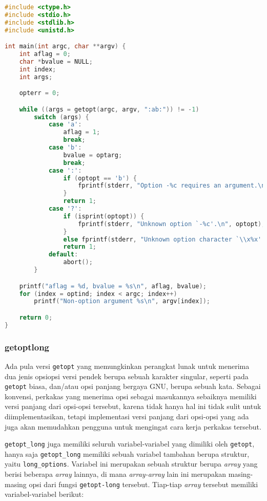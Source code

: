 \begin{lstlisting}[language=C, caption=Contoh sederhana penggunaan getopt, label=code:getopt-usage]
#include <ctype.h>
#include <stdio.h>
#include <stdlib.h>
#include <unistd.h>

int main(int argc, char **argv) {
    int aflag = 0;
    char *bvalue = NULL;
    int index;
    int args;

    opterr = 0;

    while ((args = getopt(argc, argv, ":ab:")) != -1)
        switch (args) {
	        case 'a':
	            aflag = 1;
	            break;
	        case 'b':
	            bvalue = optarg;
	            break;
	        case ':':
    	        if (optopt == 'b') {
	                fprintf(stderr, "Option -%c requires an argument.\n", optopt);
	            }
	            return 1;
	        case '?':
	            if (isprint(optopt)) {
	                fprintf(stderr, "Unknown option `-%c'.\n", optopt);
	            }
	            else fprintf(stderr, "Unknown option character `\\x%x'.\n", optopt);
	            return 1;
	        default:
	            abort();
        }

    printf("aflag = %d, bvalue = %s\n", aflag, bvalue);
    for (index = optind; index < argc; index++)
        printf("Non-option argument %s\n", argv[index]);

    return 0;
}
\end{lstlisting}

\subsubsection{getopt\textunderscore long}
\label{sec:cmodules-getopt-long}

Ada pula versi \verb|getopt| yang memungkinkan perangkat lunak untuk menerima dua jenis opsi\textemdash opsi versi pendek berupa sebuah karakter singular, seperti pada \verb|getopt| biasa, dan/atau opsi panjang bergaya GNU, berupa sebuah kata. Sebagai konvensi, perkakas yang menerima opsi sebagai masukannya sebaiknya memiliki versi panjang dari opsi-opsi tersebut, karena tidak hanya hal ini tidak sulit untuk diimplementasikan, tetapi implementasi versi panjang dari opsi-opsi yang ada juga akan memudahkan pengguna untuk mengingat cara kerja perkakas tersebut.

\verb|getopt_long| juga memiliki seluruh variabel-variabel yang dimiliki oleh \verb|getopt|, hanya saja \verb|getopt_long| memiliki sebuah variabel tambahan berupa struktur, yaitu \verb|long_options|. Variabel ini merupakan sebuah struktur berupa \textit{array} yang berisi beberapa \textit{array} lainnya, di mana \textit{array-array} lain ini merupakan masing-masing opsi dari fungsi \verb|getopt-long| tersebut. Tiap-tiap \textit{array} tersebut memiliki variabel-variabel berikut:

